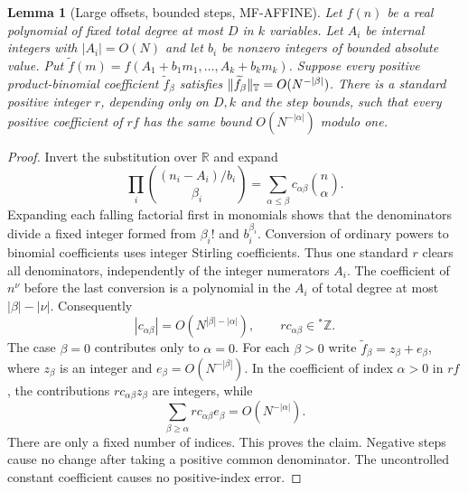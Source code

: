 \documentclass[11pt]{article}
\newtheorem{lemma}[theorem]{Lemma}
\newcommand{\Z}{\mathbb Z}\newcommand{\R}{\mathbb R}
\begin{document}
\begin{lemma}[Large offsets, bounded steps, MF-AFFINE]\label{lem:affine}
Let $f(n)$ be a real polynomial of fixed total degree at most $D$ in $k$
variables. Let $A_i$ be internal integers with $|A_i|=O(N)$ and let $b_i$
be nonzero integers of bounded absolute value. Put
$\widetilde f(m)=f(A_1+b_1m_1,\ldots,A_k+b_km_k)$.
Suppose every positive product-binomial coefficient $\widetilde f_\beta$
satisfies $\|\widetilde f_\beta\|_\mathbb T=O(N^{-|\beta|})$.
There is a standard positive integer $r$, depending only on $D,k$ and the
step bounds, such that every positive coefficient of $rf$ has the same
bound $O(N^{-|\alpha|})$ modulo one.
\end{lemma}
\begin{proof}
Invert the substitution over $\R$ and expand
\[
 \prod_i\binom{(n_i-A_i)/b_i}{\beta_i}
        =\sum_{\alpha\leq\beta}c_{\alpha\beta}\binom n\alpha.
                                                               \tag{3}
\]
Expanding each falling factorial first in monomials shows that the
denominators divide a fixed integer formed from $\beta_i!$ and
$b_i^{\beta_i}$. Conversion of ordinary powers to binomial coefficients
uses integer Stirling coefficients. Thus one standard $r$ clears all
denominators, independently of the integer numerators $A_i$.
The coefficient of $n^\nu$ before the last conversion is a polynomial in
the $A_i$ of total degree at most $|\beta|-|\nu|$. Consequently
\[
 |c_{\alpha\beta}|=O(N^{|\beta|-|\alpha|}),
 \qquad rc_{\alpha\beta}\in{}^*\Z.                             \tag{4}
\]
The case $\beta=0$ contributes only to $\alpha=0$.
For each $\beta>0$ write $\widetilde f_\beta=z_\beta+e_\beta$, where
$z_\beta$ is an integer and $e_\beta=O(N^{-|\beta|})$.
In the coefficient of index $\alpha>0$ in $rf$, the contributions
$rc_{\alpha\beta}z_\beta$ are integers, while
\[
 \sum_{\beta\geq\alpha}rc_{\alpha\beta}e_\beta
                         =O(N^{-|\alpha|}).                    \tag{5}
\]
There are only a fixed number of indices. This proves the claim. Negative
steps cause no change after taking a positive common denominator. The
uncontrolled constant coefficient causes no positive-index error.
\end{proof}
\end{document}
